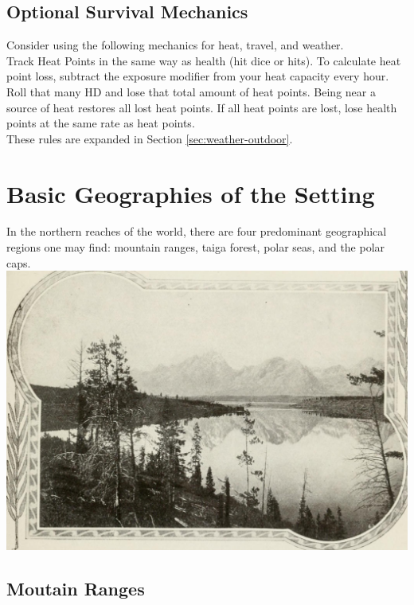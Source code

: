 \documentclass[notitlepage]{article}
\begin{document}
\begin{multicols}{2}
\subsection*{Optional Survival Mechanics}

Consider using the following mechanics for heat, travel, and weather. \\

Track Heat Points in the same way as health (hit dice or hits).
To calculate heat point loss, subtract the exposure modifier from your heat capacity every hour.
Roll that many HD and lose that total amount of heat points.
Being near a source of heat restores all lost heat points.
If all heat points are lost, lose health points at the same rate as heat points. \\

These rules are expanded in Section \ref{sec:weather-outdoor}.

\section{Basic Geographies of the Setting}

In the northern reaches of the world, there are four predominant geographical regions one may find: mountain ranges, taiga forest, polar seas, and the polar caps. \\

{\centering
\includegraphics[width=\columnwidth]{geography-mountains}
}


\subsection*{Moutain Ranges}


\end{multicols}
\end{document}
